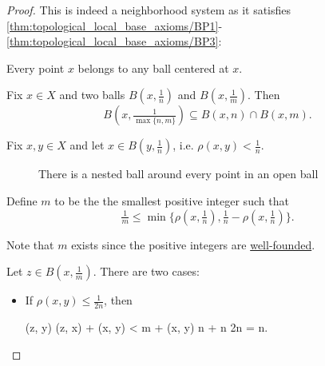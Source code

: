 \begin{proof}
  This is indeed a neighborhood system as it satisfies \ref{thm:topological_local_base_axioms/BP1}-\ref{thm:topological_local_base_axioms/BP3}:

  \begin{refenum}
     Every point \( x \) belongs to any ball centered at \( x \).

     Fix \( x \in X \) and two balls \( B(x, \tfrac 1 n) \) and \( B(x, \tfrac 1 m) \). Then
    \begin{equation*}
      B(x, \tfrac 1 {\max\{ n, m \}}) \subseteq B(x, n) \cap B(x, m).
    \end{equation*}

     Fix \( x, y \in X \) and let \( x \in B(y, \tfrac 1 n) \), i.e. \( \rho(x, y) < \tfrac 1 n \).

    \begin{figure}[!ht]
      \centering
      \iffalse\begin{mplibcode}
        u := 1cm;
        r := sqrt(2) / 2;

        pair v;
        v := (1, 1);

        beginfig(1);
        draw fullcircle scaled 3u;
        dotlabel.bot("$y$", origin);

        draw fullcircle scaled 1u shifted (-r * u * v);
        dotlabel.bot("$x_1$", -r * u * v);

        draw fullcircle scaled 1u shifted (r/2 * u * v);
        dotlabel.bot("$x_2$", r/2 * u * v);
        endfig;
      \end{mplibcode}\fi
      \caption{There is a nested ball around every point in an open ball}\label{def:metric_topology/nested_balls}
    \end{figure}

    Define \( m \) to be the the smallest positive integer such that
    \begin{equation*}
      \tfrac 1 m \leq \min\{ \rho(x, \tfrac 1 n), \tfrac 1 n - \rho(x, \tfrac 1 n) \}.
    \end{equation*}

    Note that \( m \) exists since the positive integers are \hyperref[def:well_founded_relation]{well-founded}.

    Let \( z \in B(x, \tfrac 1 m) \). There are two cases:
    \begin{itemize}
      \item If \( \rho(x, y) \leq \tfrac 1 {2n} \), then
            \begin{balign*}
              \rho(z, y)
              \leq
              \rho(z, x) + \rho(x, y)
              <
               m + \rho(x, y)
              \leq
               n +  n
                {2n}
              =
               n.
            \end{balign*}


\end{itemize}
\end{refenum}
\end{proof}
